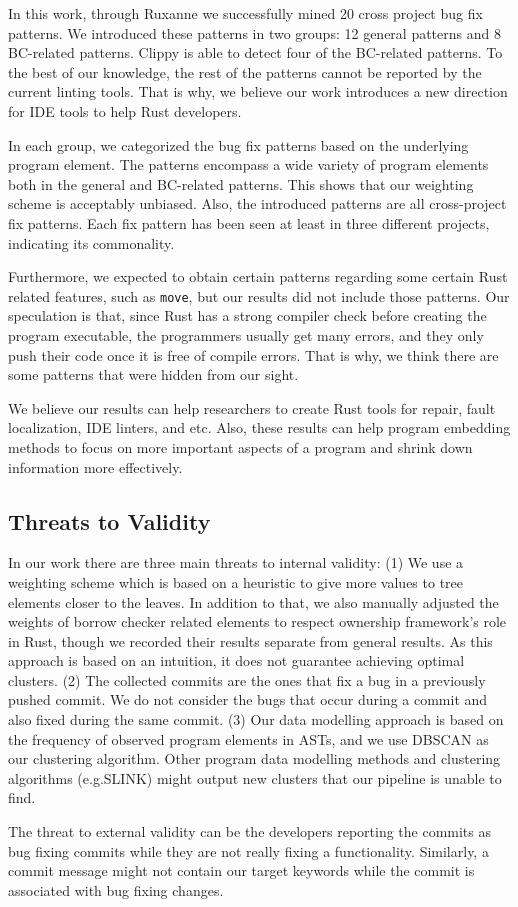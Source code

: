 In this work, through Ruxanne we successfully mined 20 cross project bug fix patterns. We introduced these patterns in two groups: 12 general patterns and 8 BC-related patterns. Clippy is able to detect four of the BC-related patterns. To the best of our knowledge, the rest of the patterns cannot be reported by the current linting tools. That is why, we believe our work introduces a new direction for IDE tools to help Rust developers.

In each group, we categorized the bug fix patterns based on the underlying program element. The patterns encompass a wide variety of program elements both in the general and BC-related patterns. This shows that our weighting scheme is acceptably unbiased. Also, the introduced patterns are all cross-project fix patterns. Each fix pattern has been seen at least in three different projects, indicating its commonality.

Furthermore, we expected to obtain certain patterns regarding some certain Rust related features, such as \verb+move+, but our results did not include those patterns. Our speculation is that, since Rust has a strong compiler check before creating the program executable, the programmers usually get many errors, and they only push their code once it is free of compile errors. That is why, we think there are some patterns that were hidden from our sight.

We believe our results can help researchers to create Rust tools for repair, fault localization, IDE linters, and etc. Also, these results can help program embedding methods to focus on more important aspects of a program and shrink down information more effectively.

\subsection{Threats to Validity}

In our work there are three main threats to internal validity: (1) We use a weighting scheme which is based on a heuristic to give more values to tree elements closer to the leaves. In addition to that, we also manually adjusted the weights of borrow checker related elements to respect ownership framework's role in Rust, though we recorded their results separate from general results. As this approach is based on an intuition, it does not guarantee achieving optimal clusters. (2) The collected commits are the ones that fix a bug in a previously pushed commit. We do not consider the bugs that occur during a commit and also fixed during the same commit. (3) Our data modelling approach is based on the frequency of observed program elements in ASTs, and we use DBSCAN as our clustering algorithm. Other program data modelling methods and clustering algorithms (e.g.SLINK) might output new clusters that our pipeline is unable to find. 

The threat to external validity can be the developers reporting the commits as bug fixing commits while they are not really fixing a functionality. Similarly, a commit message might not contain our target keywords while the commit is associated with bug fixing changes.
